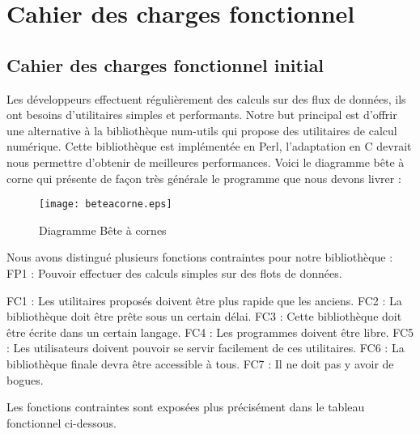\chapter{Cahier des charges fonctionnel}

\section{Cahier des charges fonctionnel initial}
Les d\'eveloppeurs effectuent r\'eguli\`erement des calculs sur des flux de donn\'ees, ils ont besoins d'utilitaires simples et performants.
Notre but principal est d'offrir une alternative \`a la biblioth\`eque num-utils qui propose des utilitaires de calcul num\'erique. 
Cette biblioth\`eque est impl\'ement\'ee en Perl, l'adaptation en C devrait nous permettre d'obtenir de meilleures performances.
Voici le diagramme b\^ete \`a corne qui pr\'esente de fa\c con tr\`es g\'en\'erale le programme que nous devons livrer : 

\begin{figure}[h]
\begin{center}
\texttt{[image: beteacorne.eps]}
\end{center}
\caption{Diagramme B\^ete \`a cornes}
\label{fig:numprocess}
\end{figure}

Nous avons distingu\'e plusieurs fonctions contraintes pour notre biblioth\`eque : 
\newline
FP1 : Pouvoir effectuer des calculs simples sur des flots de donn\'ees.
\newline

FC1 : Les utilitaires propos\'es doivent \^etre plus rapide que les anciens.
\newline
FC2 : La biblioth\`eque doit \^etre pr\^ete sous un certain d\'elai.
\newline
FC3 : Cette biblioth\`eque doit \^etre \'ecrite dans un certain langage.
\newline
FC4 : Les programmes doivent \^etre libre.
\newline
FC5 : Les utilisateurs doivent pouvoir se servir facilement de ces utilitaires.
\newline
FC6 : La biblioth\`eque finale devra \^etre accessible  \`a tous.
\newline
FC7 : Il ne doit pas y avoir de bogues.
\newline


Les fonctions contraintes sont expos\'ees plus pr\'ecis\'ement dans le tableau fonctionnel ci-dessous.

